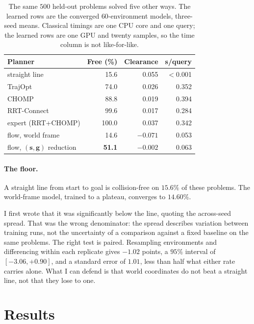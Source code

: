 \documentclass[11pt,a4paper]{article}
\newcommand{\toprule}{\hline}
\newcommand{\midrule}{\hline}
\newcommand{\bottomrule}{\hline}
\newcommand{\svec}{\mathbf{s}}
\newcommand{\gvec}{\mathbf{g}}
\begin{document}
\begin{table}[t]
\centering\small
\begin{tabular}{lrrr}
\toprule
Planner & Free (\%) & Clearance & s/query \\
\midrule
straight line                   & 15.6 & 0.055 & $<$0.001 \\
TrajOpt                         & 74.0 & 0.026 & 0.352 \\
CHOMP                           & 88.8 & 0.019 & 0.394 \\
RRT-Connect                     & 99.6 & 0.017 & 0.284 \\
expert (RRT+CHOMP)              & 100.0 & 0.037 & 0.342 \\
\midrule
flow, world frame               & 14.6 & $-0.071$ & 0.053 \\
flow, $(\svec,\gvec)$ reduction & \textbf{51.1} & $-0.002$ & 0.063 \\
\bottomrule
\end{tabular}
\caption{The same $500$ held-out problems solved five other ways. The learned
rows are the converged $60$-environment models, three-seed means. Classical timings
are one CPU core and one query; the learned rows are one GPU and twenty samples,
so the time column is not like-for-like.}
\label{tab:baselines}
\end{table}

\paragraph{The floor.} A straight line from start to goal is collision-free on
$15.6\%$ of these problems. The world-frame model, trained to a plateau, converges
to $14.60\%$.

I first wrote that it was significantly below the line, quoting the across-seed
spread. That was the wrong denominator: the spread describes variation between
training runs, not the uncertainty of a comparison against a fixed baseline on
the same problems. The right test is paired. Resampling environments and
differencing within each replicate gives $-1.02$ points, a $95\%$ interval of
$[-3.06, +0.90]$, and a standard error of $1.01$, less than half what either rate
carries alone. What I can defend is that world coordinates do not beat a straight
line, not that they lose to one.

\section{Results}
\label{sec:results}
\end{document}
